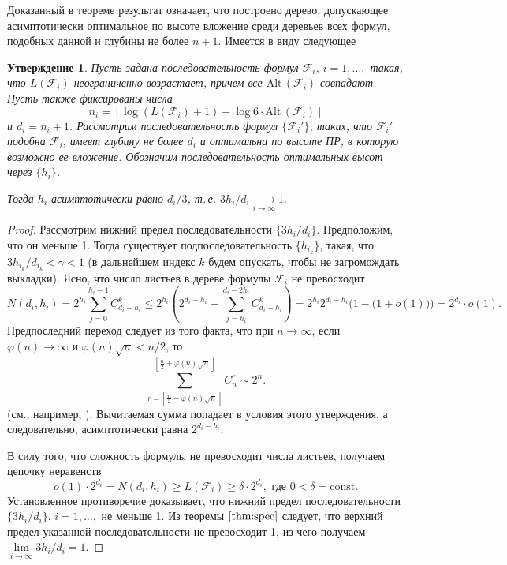\documentclass[12pt, a4paper]{article}
\theoremstyle{plain}
\newtheorem{assertion}{Утверждение}
\theoremstyle{definition}
\theoremstyle{definition}
\newcommand{\Sum}{\displaystyle\sum\limits}
\newcommand{\floor}[1]{\left\lfloor{#1}\right\rfloor}
\newcommand{\ceil}[1]{\left\lceil{#1}\right\rceil}
\renewcommand{\le}{\leqslant}
\renewcommand{\ge}{\geqslant}
\renewcommand{\phi}{\varphi}
\newcommand{\Alt}{\mathrm{Alt}\,}
\newcommand{\F}{\mathscr{F}}
\begin{document}
 Доказанный в теореме результат означает, что построено дерево, допускающее асимптотически оптимальное по высоте вложение среди деревьев всех формул, подобных данной и глубины не более $n+1$. Имеется в виду следующее
  \begin{assertion}
  Пусть задана последовательность формул $\F_i$, $i=1,\dots,$ такая\textup{,} что
   $L(\F_i)$ неограниченно возрастает\textup{,} причем все
  $\Alt(\F_i)$ совпадают. Пусть также фиксированы числа
 \[
 n_i = \ceil{\log (L(\F_i) + 1) + \log  6 \cdot \Alt(\F_i)}
 \]
 и $d_i = n_i + 1$.
 Рассмотрим последовательность формул $\{\F_i'\}$\textup{,} таких\textup{,} что $\F_i'$ подобна $\F_i$\textup{,} имеет глубину не более $d_i$ и 
 оптимальна по высоте \textup{ПР}\textup{,} в которую возможно ее вложение. Обозначим последовательность оптимальных высот через $\{h_i\}$.
 
 Тогда $h_i$ асимптотически равно $d_i/3$\textup{,} т.\,е.
 $
 	 3h_i/d_i \xrightarrow[i \to \infty]{} 1. 
 $
 \end{assertion}
 \begin{proof}
 Рассмотрим нижний предел последовательности $\{3h_i/d_i\}$. Предположим, что он меньше 1. Тогда существует подпоследовательность $\{h_{i_k}\}$, такая, что $3h_{i_k}/d_{i_k} < \gamma < 1$ (в дальнейшем индекс $k$ будем опускать, чтобы не загромождать выкладки).
 Ясно, что число листьев в дереве формулы $\F_i$ не превосходит
 \[
 N(d_i, h_i) = 2^{h_i} \Sum_{j=0}^{h_i-1} C_{d_i-h_i}^k \le 
 2^{h_i}(2^{d_i-h_i} - \Sum_{j=h_i}^{d_i-2h_i}C_{d_i-h_i}^k) = 
 2^{h_i}2^{d_i-h_i}\Big(1 - \big(1 + o(1)\big)\Big) = 2^{d_i}\cdot o(1).
 \]
  Предпоследний переход следует из того факта, что
  при $n \to \infty$, если $\phi(n) \to \infty$ и
  $\phi(n)\sqrt{n} < n/2$, то
  \[
  \Sum_{r = \floor{\frac{n}{2} - \phi(n)\sqrt{n}}}^{\floor{\frac{n}{2} + \phi(n)\sqrt{n}}} C_n^r \sim 2^n.
  \]
  (см., например, \cite{selezn}).
 Вычитаемая сумма попадает в условия этого утверждения, а следовательно, асимптотически равна $2^{d_i-h_i}$. 
 
 В силу того, что сложность формулы не превосходит числа листьев, получаем цепочку неравенств
 \[
 	o(1)\cdot2^{d_i} = N(d_i, h_i) \ge L(\F_i) \ge \delta \cdot 2^{d_i}, \text{ где } 0 < \delta = \mathrm{const}.
 \]
 Установленное противоречие доказывает, что нижний предел последовательности $\{3h_i/d_i\}$, $i=1,\dots,$ не меньше 1. Из теоремы $\ref{thm:spec}$ следует, что верхний предел указанной последовательности не превосходит 1, из 
 чего получаем $\lim\limits_{i \to \infty}3h_i/d_i = 1$.
 \end{proof}
\newpage
\end{document}
